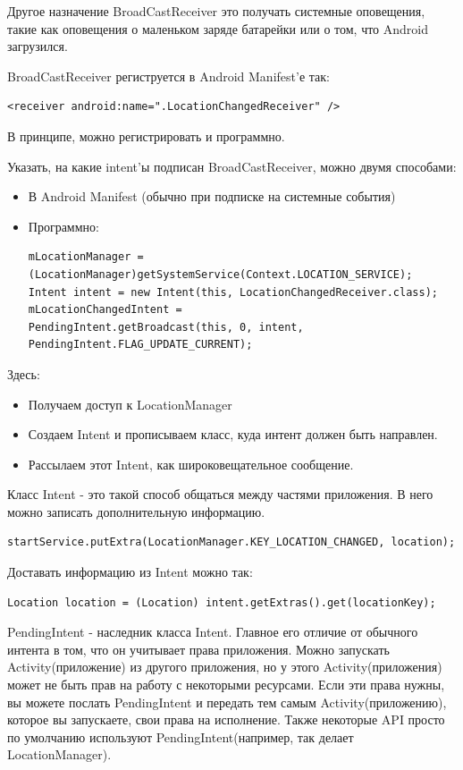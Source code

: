 \documentclass[12 pt]{article}
\begin{document}
    Другое назначение BroadCastReceiver это получать системные оповещения, такие как оповещения о маленьком заряде батарейки или о том, что Android загрузился.
    
    BroadCastReceiver региструется в Android Manifest'е так:
    \begin{lstlisting}
<receiver android:name=".LocationChangedReceiver" />
    \end{lstlisting} 
    
    В принципе, можно регистрировать и программно.
    
    Указать, на какие intent'ы подписан BroadCastReceiver, можно двумя способами:
	\begin{itemize}
    	\item В Android Manifest (обычно при подписке на системные события)
		\item Программно:
        \begin{lstlisting}
mLocationManager = (LocationManager)getSystemService(Context.LOCATION_SERVICE);
Intent intent = new Intent(this, LocationChangedReceiver.class);
mLocationChangedIntent =
PendingIntent.getBroadcast(this, 0, intent, PendingIntent.FLAG_UPDATE_CURRENT);
    \end{lstlisting}
    \end{itemize}
     Здесь:
	\begin{itemize}
    \item Получаем доступ к LocationManager
	\item Создаем Intent и прописываем класс, куда интент должен быть направлен.
	\item Рассылаем этот Intent, как широковещательное сообщение.
    \end{itemize}
	Класс Intent - это такой способ общаться между частями приложения. В него можно записать дополнительную информацию.
        \begin{lstlisting}
startService.putExtra(LocationManager.KEY_LOCATION_CHANGED, location);
        \end{lstlisting}        
        
    Доставать информацию из Intent можно так:
        \begin{lstlisting}
Location location = (Location) intent.getExtras().get(locationKey);
        \end{lstlisting}
    PendingIntent - наследник класса Intent. Главное его отличие от обычного интента в том, что он учитывает права приложения. Можно запускать Activity(приложение) из другого приложения, но у этого Activity(приложения) может не быть прав на работу с некоторыми ресурсами. Если эти права нужны, вы можете послать PendingIntent и передать тем самым Activity(приложению), которое вы запускаете, свои права на исполнение. Также некоторые API просто по умолчанию используют PendingIntent(например, так делает LocationManager). 
    
\end{document}
